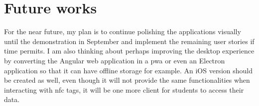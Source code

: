 \documentclass[twoside, openright,11pt,a4paper]{book}
\begin{document}
\section{Future works}
For the near future, my plan is to continue polishing the applications visually until the demonstration in September and implement the remaining user stories if time permits. I am also thinking about perhaps improving the desktop experience by converting the Angular web application in a \gls{pwa} or even an Electron application so that it can have offline storage for example. An iOS version should be created as well, even though it will not provide the same functionalities when interacting with \gls{nfc} tags, it will be one more client for students to access their data.
\backmatter
{}
\pagestyle{plain}


\end{document}
